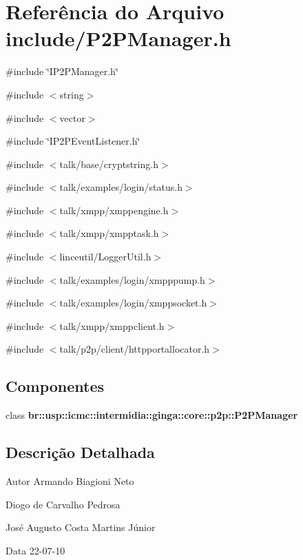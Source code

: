 \section{Referência do Arquivo include/P2PManager.h}
\label{P2PManager_8h}
{\ttfamily \#include \char`\"{}IP2PManager.h\char`\"{}}\par
{\ttfamily \#include $<$string$>$}\par
{\ttfamily \#include $<$vector$>$}\par
{\ttfamily \#include \char`\"{}IP2PEventListener.h\char`\"{}}\par
{\ttfamily \#include $<$talk/base/cryptstring.h$>$}\par
{\ttfamily \#include $<$talk/examples/login/status.h$>$}\par
{\ttfamily \#include $<$talk/xmpp/xmppengine.h$>$}\par
{\ttfamily \#include $<$talk/xmpp/xmpptask.h$>$}\par
{\ttfamily \#include $<$linceutil/LoggerUtil.h$>$}\par
{\ttfamily \#include $<$talk/examples/login/xmpppump.h$>$}\par
{\ttfamily \#include $<$talk/examples/login/xmppsocket.h$>$}\par
{\ttfamily \#include $<$talk/xmpp/xmppclient.h$>$}\par
{\ttfamily \#include $<$talk/p2p/client/httpportallocator.h$>$}\par
\subsection*{Componentes}
\begin{DoxyCompactItemize}
\item 
class {\bf br::usp::icmc::intermidia::ginga::core::p2p::P2PManager}
\end{DoxyCompactItemize}


\subsection{Descrição Detalhada}
\begin{DoxyAuthor}{Autor}
Armando Biagioni Neto 

Diogo de Carvalho Pedrosa 

José Augusto Costa Martins Júnior 
\end{DoxyAuthor}
\begin{DoxyDate}{Data}
22-\/07-\/10 
\end{DoxyDate}
